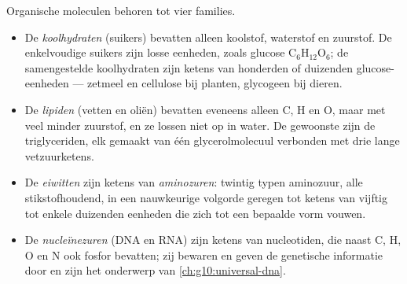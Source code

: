 \begin{definition}\label{def:g10:chemistry-of-life:families}
Organische moleculen behoren tot vier families.
\begin{itemize}
  \item De \emph{koolhydraten} (suikers) bevatten
        alleen koolstof, waterstof en zuurstof. De enkelvoudige suikers
        zijn losse eenheden, zoals glucose $\mathrm{C_6H_{12}O_6}$; de
        samengestelde koolhydraten zijn ketens van honderden of
        duizenden glucose-eenheden --- zetmeel en cellulose bij planten,
        glycogeen bij dieren.
  \item De \emph{lipiden} (vetten en oliën) bevatten
        eveneens alleen C, H en O, maar met veel minder zuurstof, en ze
        lossen niet op in water. De gewoonste zijn de triglyceriden,
        elk gemaakt van één glycerolmolecuul verbonden met drie lange
        vetzuurketens.
  \item De \emph{eiwitten} zijn ketens van
        \emph{aminozuren}: twintig typen aminozuur,
        alle stikstofhoudend, in een nauwkeurige volgorde geregen tot
        ketens van vijftig tot enkele duizenden eenheden die zich tot
        een bepaalde vorm vouwen.
  \item De \emph{nucleïnezuren} (DNA en RNA) zijn
        ketens van nucleotiden, die naast C, H, O en N ook fosfor
        bevatten; zij bewaren en geven de genetische informatie door en
        zijn het onderwerp van \cref{ch:g10:universal-dna}.
\end{itemize}
\end{definition}

